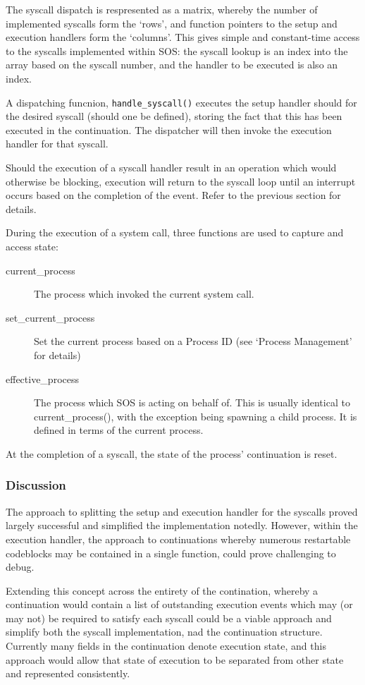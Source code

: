 \documentclass[a4paper,12pt]{article}
\begin{document}
The syscall dispatch is respresented as a matrix, whereby the number of
implemented syscalls form the `rows', and function pointers to the setup and
execution handlers form the `columns'.  This gives simple and constant-time
access to the syscalls implemented within SOS: the syscall lookup is an index
into the array based on the syscall number, and the handler to be executed is
also an index.

A dispatching funcnion, \texttt{handle\_syscall()} executes the setup handler
should for the desired syscall (should one be defined), storing the fact that
this has been executed in the continuation.  The dispatcher will then invoke
the execution handler for that syscall.

Should the execution of a syscall handler result in an operation which would
otherwise be blocking, execution will return to the syscall loop until an
interrupt occurs based on the completion of the event.  Refer to the previous
section for details.

During the execution of a system call, three functions are used to capture and
access state:
\begin{description}
\item[current\_process] The process which invoked the current system call.
\item[set\_current\_process] Set the current process based on a Process ID (see
  `Process Management' for details)
\item[effective\_process] The process which SOS is acting on behalf of.  This
  is usually identical to current\_process(), with the exception being spawning
  a child process.  It is defined in terms of the current process.
\end{description}
At the completion of a syscall, the state of the process' continuation is
reset.

\subsubsection{Discussion}
The approach to splitting the setup and execution handler for the syscalls
proved largely successful and simplified the implementation notedly.  However,
within the execution handler, the approach to continuations whereby numerous
restartable codeblocks may be contained in a single function, could prove
challenging to debug.

Extending this concept across the entirety of the contination, whereby a
continuation would contain a list of outstanding execution events which may
(or may not) be required to satisfy each syscall could be a viable approach
and simplify both the syscall implementation, nad the continuation structure.
Currently many fields in the continuation denote execution state, and this
approach would allow that state of execution to be separated from other state
and represented consistently.
\end{document}
